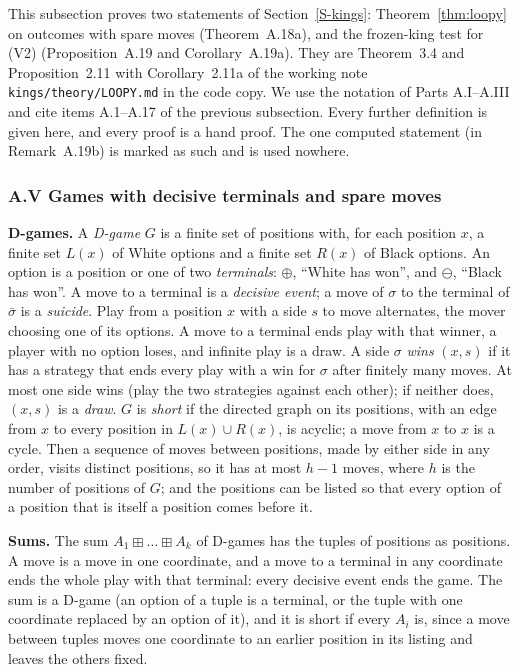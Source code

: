 
This subsection proves two statements of Section~\ref{S-kings}: Theorem~\ref{thm:loopy} on outcomes with spare moves
(Theorem~A.18a), and the frozen-king test for (V2) (Proposition~A.19 and Corollary~A.19a). They are Theorem~3.4 and
Proposition~2.11 with Corollary~2.11a of the working note \texttt{kings/theory/LOOPY.md} in the code copy. We use the
notation of Parts A.I--A.III and cite items A.1--A.17 of the previous subsection. Every further definition is given
here, and every proof is a hand proof. The one computed statement (in Remark~A.19b) is marked as such and is used
nowhere.

\subsubsection*{A.V Games with decisive terminals and spare moves}

\textbf{D-games.} A \emph{D-game} $G$ is a finite set of positions with, for each position $x$, a finite set $L(x)$ of
White options and a finite set $R(x)$ of Black options. An option is a position or one of two \emph{terminals}:
$\oplus$, ``White has won'', and $\ominus$, ``Black has won''. A move to a terminal is a \emph{decisive event}; a move of
$\sigma$ to the terminal of $\bar\sigma$ is a \emph{suicide}. Play from a position $x$ with a side $s$ to move
alternates, the mover choosing one of its options. A move to a terminal ends play with that winner, a player with no
option loses, and infinite play is a draw. A side $\sigma$ \emph{wins} $(x,s)$ if it has a strategy that ends every play
with a win for $\sigma$ after finitely many moves. At most one side wins (play the two strategies against each other);
if neither does, $(x,s)$ is a \emph{draw}. $G$ is \emph{short} if the directed graph on its positions, with an edge from
$x$ to every position in $L(x)\cup R(x)$, is acyclic; a move from $x$ to $x$ is a cycle. Then a sequence of moves
between positions, made by either side in any order, visits distinct positions, so it has at most $h-1$ moves, where $h$
is the number of positions of $G$; and the positions can be listed so that every option of a position that is itself a
position comes before it.

\textbf{Sums.} The sum $A_1\boxplus\dots\boxplus A_k$ of D-games has the tuples of positions as positions. A move is a
move in one coordinate, and a move to a terminal in any coordinate ends the whole play with that terminal: every
decisive event ends the game. The sum is a D-game (an option of a tuple is a terminal, or the tuple with one coordinate
replaced by an option of it), and it is short if every $A_i$ is, since a move between tuples moves one coordinate
to an earlier position in its listing and leaves the others fixed.


